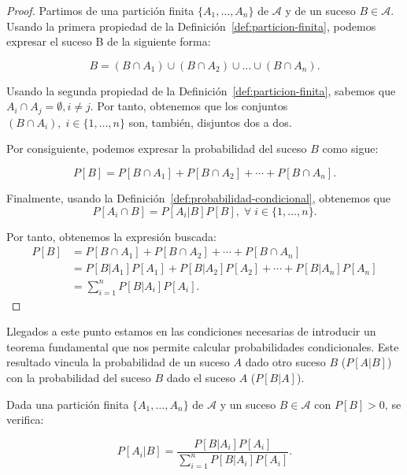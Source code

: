 \begin{proof}
    Partimos de una partición finita $\{A_1, \ldots, A_n \}$ de $\mathcal{A}$ y de un suceso $B \in \mathcal{A}$. Usando la primera propiedad de la Definición~\ref{def:particion-finita}, podemos expresar el suceso B de la siguiente forma:

    \[ B = (B \cap A_1) \cup (B \cap A_2) \cup \ldots \cup (B \cap A_n). \]\newline

    Usando la segunda propiedad de la Definición~\ref{def:particion-finita}, sabemos que $A_i \cap A_j = \emptyset, i \neq j$. Por tanto, obtenemos que los conjuntos $(B \cap A_i), \; i \in \{1, \ldots, n\}$ son, también, disjuntos dos a dos.\newline

    Por consiguiente, podemos expresar la probabilidad del suceso $B$ como sigue:

    \[ P[B] = P[B \cap A_1] + P[B \cap A_2] + \cdots + P[B \cap A_n]. \]\newline

    Finalmente, usando la Definición~\ref{def:probabilidad-condicional}, obtenemos que 
    \[ P[A_i \cap B] = P[A_i | B]P[B],\; \forall \; i \in \{1, \ldots, n\}. \]\newline
    
    Por tanto, obtenemos la expresión buscada:
    \begin{align*}
        P[B] &= P[B \cap A_1] + P[B \cap A_2] + \cdots + P[B \cap A_n] \\
             &= P[B|A_1]P[A_1] + P[B|A_2]P[A_2] + \cdots + P[B|A_n]P[A_n] \\
             &= \sum_{i=1}^n P[B|A_i]P[A_i].
    \end{align*}
\end{proof}

Llegados a este punto estamos en las condiciones necesarias de introducir un teorema fundamental que nos permite calcular probabilidades condicionales. Este resultado vincula la probabilidad de un suceso $A$ dado otro suceso $B$ ($P[A|B]$) con la probabilidad del suceso $B$ dado el suceso $A$ ($P[B|A]$).\newline

\begin{teorema}\label{teo:teorema-de-bayes}
    Dada una partición finita $\{A_1, \ldots, A_n \}$ de $\mathcal{A}$ y un suceso $B \in \mathcal{A}$ con $P[B] > 0$, se verifica:

    \[ P[A_i | B] = \frac{P[B | A_i]P[A_i]}{\sum_{i=1}^n P[B|A_i]P[A_i]}. \]\newline
\end{teorema}

